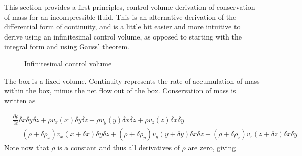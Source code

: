 This section provides a first-principles, control volume derivation of conservation of mass for an incompressible fluid.
This is an alternative derivation of the differential form of continuity, and is a little bit easier and more intuitive to derive using an infinitesimal control volume, as opposed to starting with the integral form and using Gauss' theorem.
\begin{figure}[H]
  \begin{center}
    \caption{Infinitesimal control volume}
  \end{center}
\end{figure}

The box is a fixed volume.
Continuity represents the rate of accumulation of mass within the box, minus the net flow out of the box.
Conservation of mass is written as

\begin{equation*}
  \begin{split}
    &\frac{\partial\rho}{\partial{}t}\delta x\delta y\delta z+\rho{}v_{x}(x)\delta y\delta z+\rho{}v_{y}(y)\delta x\delta z+\rho{}v_{z}(z)\delta x\delta y \\
    &=(\rho+\delta\rho_{x})v_{x}(x+\delta x)\delta y\delta z+(\rho+\delta\rho_{y})v_{y}(y+\delta y)\delta x\delta z+(\rho+\delta\rho_{z})v_{z}(z+\delta z)\delta x\delta y
  \end{split}
\end{equation*}
Note now that $\rho$ is a constant and thus all derivatives of $\rho$ are zero, giving

